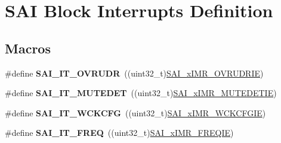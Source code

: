 \hypertarget{group___s_a_i___block___interrupts___definition}{}\section{S\+AI Block Interrupts Definition}
\label{group___s_a_i___block___interrupts___definition}
\subsection*{Macros}
\begin{DoxyCompactItemize}
\item 
\#define {\bfseries S\+A\+I\+\_\+\+I\+T\+\_\+\+O\+V\+R\+U\+DR}~((uint32\+\_\+t)\hyperlink{group___peripheral___registers___bits___definition_ga19cf98322a8a9297bf189674085a3c4d}{S\+A\+I\+\_\+x\+I\+M\+R\+\_\+\+O\+V\+R\+U\+D\+R\+IE})\hypertarget{group___s_a_i___block___interrupts___definition_gaa7be2df7b62a018c0fc447ce9066f90b}{}\label{group___s_a_i___block___interrupts___definition_gaa7be2df7b62a018c0fc447ce9066f90b}

\item 
\#define {\bfseries S\+A\+I\+\_\+\+I\+T\+\_\+\+M\+U\+T\+E\+D\+ET}~((uint32\+\_\+t)\hyperlink{group___peripheral___registers___bits___definition_ga86d1812361eb7081a60d575fbc1c664e}{S\+A\+I\+\_\+x\+I\+M\+R\+\_\+\+M\+U\+T\+E\+D\+E\+T\+IE})\hypertarget{group___s_a_i___block___interrupts___definition_gaffe60d401809d270a1f4f0b751d1f47c}{}\label{group___s_a_i___block___interrupts___definition_gaffe60d401809d270a1f4f0b751d1f47c}

\item 
\#define {\bfseries S\+A\+I\+\_\+\+I\+T\+\_\+\+W\+C\+K\+C\+FG}~((uint32\+\_\+t)\hyperlink{group___peripheral___registers___bits___definition_ga4bce2334c9381068661356c84b947507}{S\+A\+I\+\_\+x\+I\+M\+R\+\_\+\+W\+C\+K\+C\+F\+G\+IE})\hypertarget{group___s_a_i___block___interrupts___definition_ga616c46e85ebb8743a2631a74b238c610}{}\label{group___s_a_i___block___interrupts___definition_ga616c46e85ebb8743a2631a74b238c610}

\item 
\#define {\bfseries S\+A\+I\+\_\+\+I\+T\+\_\+\+F\+R\+EQ}~((uint32\+\_\+t)\hyperlink{group___peripheral___registers___bits___definition_gae0ddbd32ec7f069219827247614454f9}{S\+A\+I\+\_\+x\+I\+M\+R\+\_\+\+F\+R\+E\+Q\+IE})\hypertarget{group___s_a_i___block___interrupts___definition_ga704d8edc498b2720a16e2471059282c0}{}\label{group___s_a_i___block___interrupts___definition_ga704d8edc498b2720a16e2471059282c0}


\end{DoxyCompactItemize}
